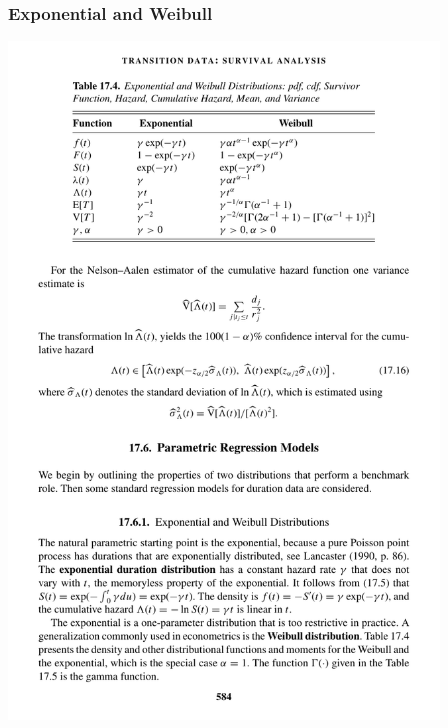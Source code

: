 \documentclass[aspectratio=169]{beamer}
\begin{document}
\begin{frame}
\frametitle{Exponential and Weibull }
\begin{center}
\includegraphics[width=4.5in]{./resources/figure17-4.pdf}
\end{center}
\end{frame}
\end{document}
